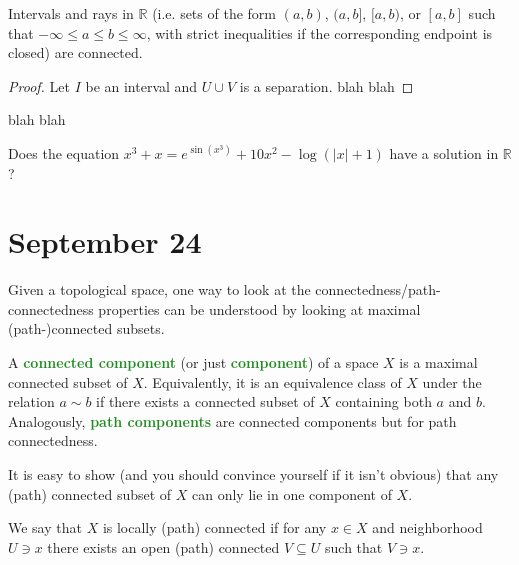 \documentclass[11pt]{scrartcl}
\providecommand{\RR}{\mathbb R}
\providecommand{\vocab}[1]{{\textbf{\textcolor{ForestGreen}{#1}}}}
\providecommand{\abs}[1]{\left|#1\right|}
\begin{document}
\begin{theorem}
    \label{thm:intervals-are-connected}
    Intervals and rays in $\RR$
    (i.e. sets of the form $(a,b)$, $(a,b]$, $[a,b)$, or $[a,b]$
    such that $-\infty\le a\le b\le\infty$, with strict inequalities
    if the corresponding endpoint is closed)
    are connected.
\end{theorem}

\begin{proof}
    Let $I$ be an interval and $U\cup V$ is a separation.
    blah blah
\end{proof}

\begin{corollary}
    \label{coro:ivt}
    blah blah
\end{corollary}

\begin{corollary}
    \label{coro:brouwer-1d}
\end{corollary}

\begin{exercise}
    Does the equation $x^3 + x = e^{\sin(x^3)} + 10x^2 - \log(\abs x+1)$
    have a solution in $\RR$?
\end{exercise}

\section{September 24}\label{sec:sep24}
Given a topological space, one way to look at
the connectedness/path-connectedness properties
can be understood by looking at maximal (path-)connected subsets.

\begin{definition}
    \label{def:connected-components}
    A \vocab{connected component} (or just \vocab{component})
    of a space $X$ is a maximal connected subset
    of $X$. Equivalently, it is an equivalence class of $X$
    under the relation $a\sim b$ if there exists a connected subset of $X$
    containing both $a$ and $b$.
    Analogously, \vocab{path components} are connected components
    but for path connectedness.
\end{definition}

It is easy to show (and you should convince yourself if it isn't obvious)
that any (path) connected subset of $X$ can only lie in one component of $X$.

\begin{definition}
    \label{def:local-connectedness}
    We say that $X$ is locally (path) connected if
    for any $x\in X$ and neighborhood $U\ni x$
    there exists an open (path) connected $V\subseteq U$ such that $V\ni x$.
\end{definition}
\end{document}
